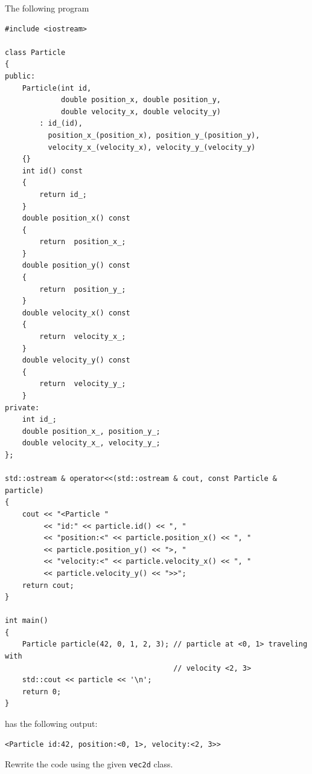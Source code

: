 

\nextq
The following program
\begin{Verbatim}[frame=single, fontsize=\footnotesize]
#include <iostream>

class Particle
{
public:
    Particle(int id,
             double position_x, double position_y,
             double velocity_x, double velocity_y)
        : id_(id),
          position_x_(position_x), position_y_(position_y),
          velocity_x_(velocity_x), velocity_y_(velocity_y)
    {}
    int id() const
    {
        return id_;
    }
    double position_x() const
    {
        return  position_x_;
    }
    double position_y() const
    {
        return  position_y_;
    }
    double velocity_x() const
    {
        return  velocity_x_;
    }
    double velocity_y() const
    {
        return  velocity_y_;
    }
private:
    int id_;
    double position_x_, position_y_;
    double velocity_x_, velocity_y_;
};

std::ostream & operator<<(std::ostream & cout, const Particle & particle)
{
    cout << "<Particle "
         << "id:" << particle.id() << ", "
         << "position:<" << particle.position_x() << ", "
         << particle.position_y() << ">, "
         << "velocity:<" << particle.velocity_x() << ", "
         << particle.velocity_y() << ">>";
    return cout;
}

int main()
{
    Particle particle(42, 0, 1, 2, 3); // particle at <0, 1> traveling with
                                       // velocity <2, 3>
    std::cout << particle << '\n';
    return 0;
}
\end{Verbatim}
has the following output:
\begin{Verbatim}[frame=single,fontsize=\footnotesize]
<Particle id:42, position:<0, 1>, velocity:<2, 3>>
\end{Verbatim}
Rewrite the code using the given \verb!vec2d! class.
\\
\ANSWER
